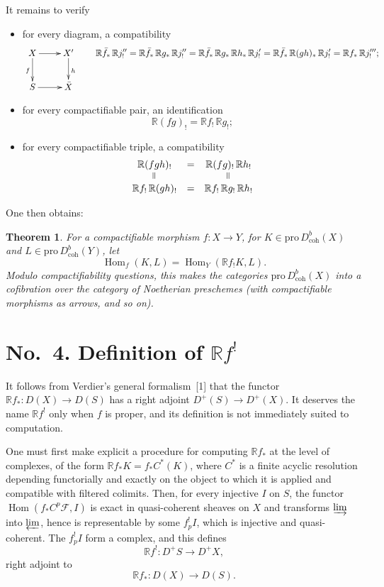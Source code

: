 \documentclass[11pt]{amsart}
\DeclareMathOperator{\Hom}{Hom}
\newcommand{\Pro}{\text{pro}\,}
\newcommand{\coh}{\text{coh}}
\newcommand{\cF}{\mathcal{F}}
\newcommand{\cDb}{D^{b}}
\newcommand{\cD}{D}
\newcommand{\bR}{\mathbb{R}}
\theoremstyle{plain}
\newtheorem{thm}{Theorem}
\theoremstyle{definition}
\begin{document}
It remains to verify
\begin{itemize}
\item[(a)] for every diagram, a compatibility
\[
\xymatrix{
X \ar[r] \ar[d]_f & X' \ar[d]^h \\
S \ar[r] & \bar X
}
\qquad
\bR\bar f_*\,\bR j''_!=\bR\bar f_*\,\bR g_*\,\bR j''_!=\bR\bar f_*\,\bR g_*\,\bR h_*\,\bR j'_!=\bR\bar f_*\,\bR(gh)_*\,\bR j'_!=\bR f_*\,\bR j'''_!;
\]
\item[(b)] for every compactifiable pair, an identification
\[
\bR(fg)_!=\bR f_!\,\bR g_!;
\]
\item[(c)] for every compactifiable triple, a compatibility
\[
\begin{array}{ccc}
\bR(fgh)_! &=& \bR(fg)_!\,\bR h_! \\
\rotatebox{90}{$=$} && \rotatebox{90}{$=$} \\
\bR f_!\,\bR(gh)_! &=& \bR f_!\,\bR g_!\,\bR h_!
\end{array}
\]
\end{itemize}
One then obtains:

\begin{thm}
For a compactifiable morphism $f\colon X\to Y$, for $K\in\Pro\cDb_{\coh}(X)$ and $L\in\Pro\cDb_{\coh}(Y)$, let
\[
\Hom_f(K,L)=\Hom_Y(\bR f_!K,L).
\]
Modulo compactifiability questions, this makes the categories $\Pro\cDb_{\coh}(X)$ into a cofibration over the category of Noetherian preschemes (with compactifiable morphisms as arrows, and so on).
\end{thm}

\section*{No.~4. Definition of $\bR f^{!}$}

It follows from Verdier's general formalism~[1] that the functor $\bR f_*\colon \cD(X)\to \cD(S)$ has a right adjoint $\cD^{+}(S)\to \cD^{+}(X)$. It deserves the name $\bR f^{!}$ only when $f$ is proper, and its definition is not immediately suited to computation.

One must first make explicit a procedure for computing $\bR f_*$ at the level of complexes, of the form $\bR f_*K=f_*C^{*}(K)$, where $C^*$ is a finite acyclic resolution depending functorially and exactly on the object to which it is applied and compatible with filtered colimits. Then, for every injective $I$ on $S$, the functor $\Hom(f_*C^p\cF,I)$ is exact in quasi-coherent sheaves on $X$ and transforms $\varinjlim$ into $\varprojlim$, hence is representable by some $f_p^!I$, which is injective and quasi-coherent. The $f_p^!I$ form a complex, and this defines
\[
\bR f^{!}\colon \cD^+S\to \cD^+X,
\]
right adjoint to
\[
\bR f_*\colon \cD(X)\to \cD(S).
\]
\end{document}
